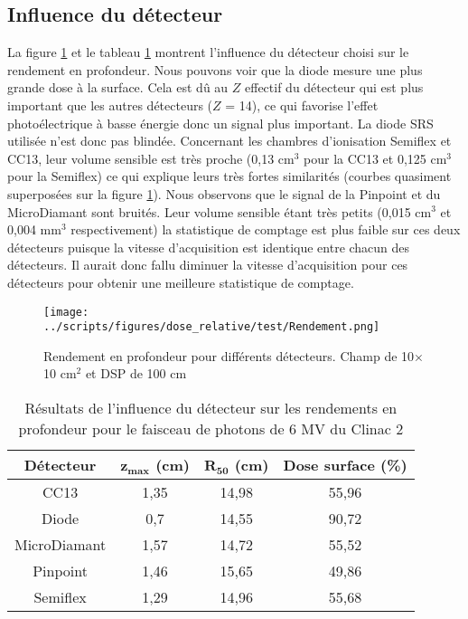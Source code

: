 \documentclass{book}
\begin{document}
\newpage
\subsection{Influence du détecteur}

La figure \ref*{fig_rdt_detecteurs} et le tableau \ref*{table_rdt_detecteurs} montrent l'influence du détecteur choisi sur le rendement en profondeur. Nous pouvons voir que la diode mesure une plus grande dose à la surface. Cela est dû au $Z$ effectif du détecteur qui est plus important que les autres détecteurs ($Z$ = 14), ce qui favorise l'effet photoélectrique à basse énergie donc un signal plus important. La diode SRS utilisée n'est donc pas blindée. Concernant les chambres d'ionisation Semiflex et CC13, leur volume sensible est très proche (0,13 cm$^3$ pour la CC13 et 0,125 cm$^3$ pour la Semiflex) ce qui explique leurs très fortes similarités (courbes quasiment superposées sur la figure \ref*{fig_rdt_detecteurs}). Nous observons que le signal de la Pinpoint et du MicroDiamant sont bruités. Leur volume sensible étant très petits (0,015 cm$^3$ et 0,004 mm$^3$ respectivement) la statistique de comptage est plus faible sur ces deux détecteurs puisque la vitesse d'acquisition est identique entre chacun des détecteurs. Il aurait donc fallu diminuer la vitesse d'acquisition pour ces détecteurs pour obtenir une meilleure statistique de comptage.

\begin{figure}[h]
  \centering
  \texttt{[image: ../scripts/figures/dose\_relative/test/Rendement.png]}
  \caption{Rendement en profondeur pour différents détecteurs. Champ de 10$\times$10 cm$^2$ et DSP de 100 cm}
  \label{fig_rdt_detecteurs}
\end{figure}

\begin{table}[h]
  \centering
  \begin{tabular}{cccc}
    \toprule
    \textbf{Détecteur} & $\mathbf{z_{max}}$ \textbf{(cm)} & $\mathbf{R_{50}}$ \textbf{(cm)} & \textbf{Dose surface (\%)} \\
    \toprule
    CC13 & 1,35 & 14,98 & 55,96 \\
    Diode & 0,7 & 14,55 & 90,72 \\
    MicroDiamant & 1,57 & 14,72 & 55,52 \\
    Pinpoint & 1,46 & 15,65 & 49,86 \\
    Semiflex & 1,29 & 14,96 & 55,68 \\
    \bottomrule
  \end{tabular}
  \caption{Résultats de l'influence du détecteur sur les rendements en profondeur pour le faisceau de photons de 6 MV du Clinac 2}
  \label{table_rdt_detecteurs}
\end{table}
\end{document}
